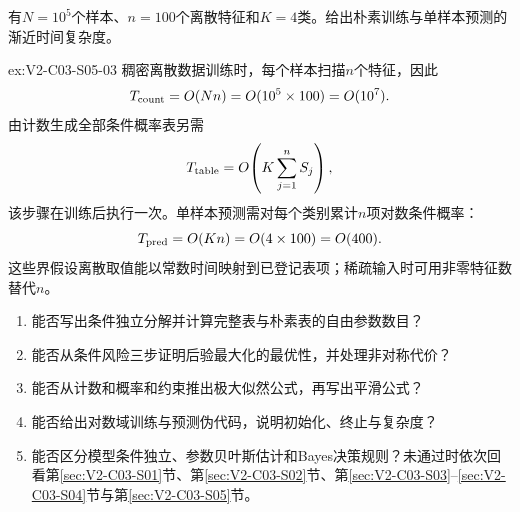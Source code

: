 \begin{SLChapterExercisePairSection}
\begin{exercise}\label{ex:V2-C03-S05-03}
有$N=10^5$个样本、$n=100$个离散特征和$K=4$类。给出朴素训练与单样本预测的渐近时间复杂度。
\end{exercise}
\ifSLFullEdition
{}\label{sol:V2-C03-S05-03}
\begin{chapterexercisesolution}{ex:V2-C03-S05-03}
稠密离散数据训练时，每个样本扫描$n$个特征，因此
\[
T_{\rm count}=O(Nn)
=O(10^5\times100)
=O(10^7).
\]
由计数生成全部条件概率表另需
\[
T_{\rm table}=O\!\left(K\sum_{j=1}^{n}S_j\right),
\]
该步骤在训练后执行一次。单样本预测需对每个类别累计$n$项对数条件概率：
\[
T_{\rm pred}=O(Kn)
=O(4\times100)
=O(400).
\]
这些界假设离散取值能以常数时间映射到已登记表项；稀疏输入时可用非零特征数替代$n$。
\end{chapterexercisesolution}
\fi

\end{SLChapterExercisePairSection}
\begin{SLCompactClosure}
\label{struct:V2-C03-CH36}

\label{struct:V2-C03-CH37}
\begin{selfcheckbox}
\begin{enumerate}[leftmargin=2.2em]
  \item 能否写出条件独立分解并计算完整表与朴素表的自由参数数目？
  \item 能否从条件风险三步证明后验最大化的最优性，并处理非对称代价？
  \item 能否从计数和概率和约束推出极大似然公式，再写出平滑公式？
  \item 能否给出对数域训练与预测伪代码，说明初始化、终止与复杂度？
  \item 能否区分模型条件独立、参数贝叶斯估计和Bayes决策规则？未通过时依次回看第\ref{sec:V2-C03-S01}节、第\ref{sec:V2-C03-S02}节、第\ref{sec:V2-C03-S03}--\ref{sec:V2-C03-S04}节与第\ref{sec:V2-C03-S05}节。
\end{enumerate}
\end{selfcheckbox}
\end{SLCompactClosure}
